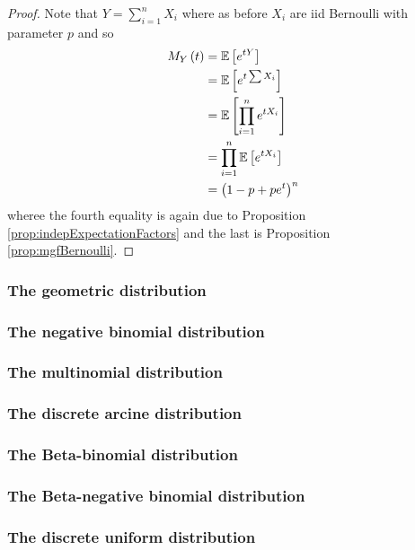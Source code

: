 \begin{proof}
Note that $Y=\sum_{i=1}^{n}X_{i}$ where as before $X_{i}$ are iid
Bernoulli with parameter $p$ and so
\begin{align*}
M_{Y}\left(t\right) & =\mathbb{E}\left[e^{tY}\right]\\
 & =\mathbb{E}\left[e^{t\sum X_{i}}\right]\\
 & =\mathbb{E}\left[\prod_{i=1}^{n}e^{tX_{i}}\right]\\
 & =\prod_{i=1}^{n}\mathbb{E}\left[e^{tX_{i}}\right]\\
 & =\left(1-p+pe^{t}\right)^{n}
\end{align*}
wheree the fourth equality is again due to Proposition \ref{prop:indepExpectationFactors}
and the last is Proposition \ref{prop:mgfBernoulli}.
\end{proof}

\subsubsection{The geometric distribution}

\subsubsection{The negative binomial distribution}

\subsubsection{The multinomial distribution}

\subsubsection{The discrete arcine distribution}

\subsubsection{The Beta-binomial distribution}

\subsubsection{The Beta-negative binomial distribution}

\subsubsection{The discrete uniform distribution\label{subsec:discreteUniformDistribution}}

